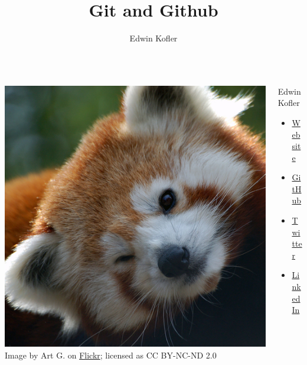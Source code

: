 \documentclass{beamer}
\title{Git and Github}
\author{Edwin Kofler}
\begin{document}
\frame{\titlepage}

\begin{frame}
	\begin{columns}
		\begin{column}{0.48\textwidth}
			\includegraphics{panda-500px.jpg} \newline
			{ \tiny Image by Art G. on \href{https://www.flickr.com/photos/digitalart/4084550022}{Flickr}; licensed as CC BY-NC-ND 2.0 }
		\end{column}
		\begin{column}{0.48\textwidth}
			{\Huge Edwin Kofler} \newline
			\begin{itemize}
				\item \href{https://edwinkofler.com/}{Website}
				\item \href{https://github.com/hyperupcall}{GitHub}
				\item \href{https://twitter.com/hyperupcall}{Twitter}
				\item \href{https://www.linkedin.com/in/hyperupcall}{LinkedIn}
			\end{itemize}
		\end{column}
	\end{columns}
\end{frame}
\end{document}

